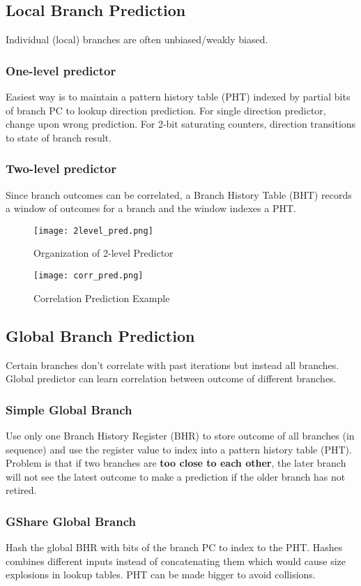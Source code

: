\documentclass{article}
\begin{document}
\begin{multicols*}{2}
\subsection*{Local Branch Prediction}
Individual (local) branches are often unbiased/weakly biased. 
\subsubsection*{One-level predictor}
Easiest way is to maintain a pattern history table (PHT) indexed by partial bits of branch PC to lookup direction prediction. For single direction predictor, change upon wrong prediction. For 2-bit saturating counters, direction transitions to state of branch result.
\subsubsection*{Two-level predictor}
Since branch outcomes can be correlated, a Branch History Table (BHT) records a window of outcomes for a branch and the window indexes a PHT.

\begin{figure}[H]
    \centering
    {\texttt{[image: 2level\_pred.png]}}
  \caption{Organization of 2-level Predictor}
\end{figure}

\begin{figure}[H]
    \centering
    {\texttt{[image: corr\_pred.png]}}
  \caption{Correlation Prediction Example}
\end{figure}

\subsection*{Global Branch Prediction}
Certain branches don't correlate with past iterations but instead all branches. Global predictor can learn correlation between outcome of different branches.
\subsubsection*{Simple Global Branch}
Use only one Branch History Register (BHR) to store outcome of all branches (in sequence) and use the register value to index into a pattern history table (PHT). Problem is that if two branches are \textbf{too close to each other}, the later branch will not see the latest outcome to make a prediction if the older branch has not retired.

\subsubsection*{GShare Global Branch}
Hash the global BHR with bits of the branch PC to index to the PHT. Hashes combines different inputs instead of concatenating them which would cause size explosions in lookup tables. PHT can be made bigger to avoid collisions.


\end{multicols*}
\end{document}
